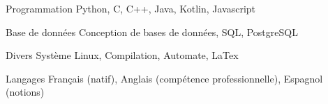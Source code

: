 

\begin{cvskills}
  \cvskill
    {Programmation} %
    {Python, C, C++, Java, Kotlin, Javascript} %

\cvskill
{Base de données} %
{Conception de bases de données, SQL, PostgreSQL} %

\cvskill
{Divers} %
{Système Linux, Compilation, Automate, LaTex} %

  \cvskill
    {Langages} %
    {Français (natif), Anglais (compétence professionnelle), Espagnol (notions)} %

\end{cvskills}
